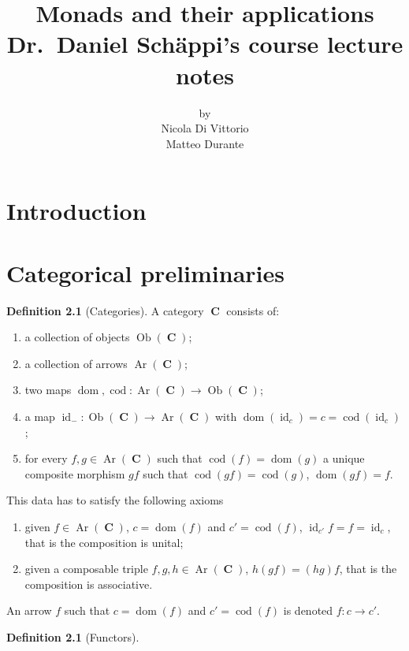 \documentclass[a4paper,11pt,twoside, openany]{book}
\DeclareMathOperator{\C}{\mathbf{C}}
\DeclareMathOperator{\id}{id}
\DeclareMathOperator{\dom}{dom}
\DeclareMathOperator{\cod}{cod}
\DeclareMathOperator{\Ob}{Ob}
\DeclareMathOperator{\Ar}{Ar}
\theoremstyle{definition}
\theoremstyle{definition}
\newtheorem{defn}[thm]{Definition} %
\theoremstyle{remark}
\begin{document}
	
	\author{by \\
		Nicola Di Vittorio \\ Matteo Durante}
	\title{\huge Monads and their applications \\
		\vspace*{5mm}
		\large Dr.\ Daniel Schäppi's course lecture notes} 
	\date{}
	
	\frontmatter
	\maketitle
	\tableofcontents
	
	\chapter{Introduction}
	
	\mainmatter
	
	\chapter{Categorical preliminaries}
	\begin{defn}[Categories]
		A category $\C$ consists of:
		\begin{enumerate}
			\item a collection of objects $\Ob(\C)$;
			\item a collection of arrows $\Ar(\C)$;
			\item two maps $\dom,\cod\colon\Ar(\C)\rightarrow\Ob(\C)$;
			\item a map $\id_{-}\colon\Ob(\C)\rightarrow\Ar(\C)$ with $\dom(\id_{c})=c=\cod(\id_{c})$;
			\item for every $f,g\in\Ar(\C)$ such that $\cod(f)=\dom(g)$ a unique composite morphism $gf$ such that $\cod(gf)=\cod(g)$, $\dom(gf)=f$.
		\end{enumerate}
	This data has to satisfy the following axioms
		\begin{enumerate}
			\item given $f\in\Ar(\C)$, $c=\dom(f)$ and $c'=\cod(f)$, $\id_{c'}f=f=\id_{c}$, that is the composition is unital;
			\item given a composable triple $f,g,h\in\Ar(\C)$, $h(gf)=(hg)f$, that is the composition is associative.
		\end{enumerate}
		An arrow $f$ such that $c=\dom(f)$ and $c'=\cod(f)$ is denoted $f\colon c\rightarrow c'$.
	\end{defn}
	
	\begin{defn}[Functors]
		
	\end{defn}
	
\end{document}
